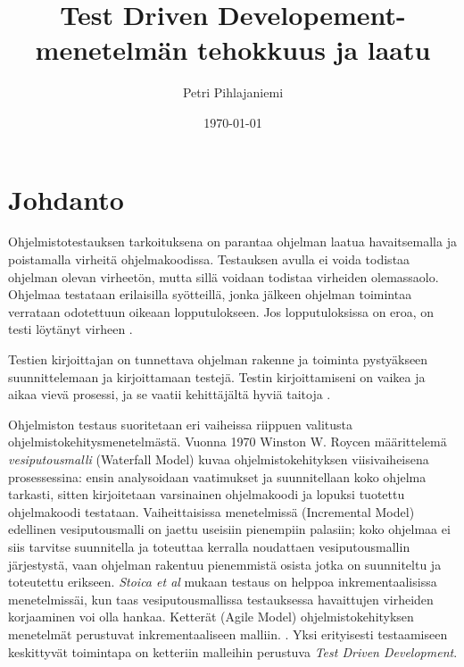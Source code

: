 \documentclass[finnish]{tktltiki2}
\title{Test Driven Developement-menetelmän tehokkuus ja laatu}
\author{Petri Pihlajaniemi}
\date{\today}
\theoremstyle{definition}
\theoremstyle{remark}
\begin{document}


\maketitle        %
\makeabstract     %

\tableofcontents  %


\mainmatter       %




\section{Johdanto}


Ohjelmistotestauksen tarkoituksena on parantaa ohjelman laatua havaitsemalla ja poistamalla virheitä ohjelmakoodissa. Testauksen avulla ei voida todistaa ohjelman olevan virheetön, mutta sillä voidaan todistaa virheiden olemassaolo. Ohjelmaa testataan erilaisilla syötteillä, jonka jälkeen ohjelman toimintaa verrataan odotettuun oikeaan lopputulokseen. Jos lopputuloksissa on eroa, on testi löytänyt virheen \cite{Muccini08}.


Testien kirjoittajan on tunnettava ohjelman rakenne ja toiminta pystyäkseen suunnittelemaan ja kirjoittamaan testejä. Testin kirjoittamiseni on vaikea ja aikaa vievä prosessi, ja se vaatii kehittäjältä hyviä taitoja \cite{Whittaker00}.

Ohjelmiston testaus suoritetaan eri vaiheissa riippuen valitusta ohjelmistokehitysmenetelmästä. Vuonna 1970 Winston W. Roycen määrittelemä \emph{vesiputousmalli} (Waterfall Model) kuvaa ohjelmistokehityksen viisivaiheisena prosessessina: ensin analysoidaan vaatimukset ja suunnitellaan koko ohjelma tarkasti, sitten kirjoitetaan varsinainen ohjelmakoodi ja lopuksi tuotettu ohjelmakoodi testataan. Vaiheittaisissa menetelmissä (Incremental Model) edellinen vesiputousmalli on jaettu useisiin pienempiin palasiin; koko ohjelmaa ei siis tarvitse suunnitella ja toteuttaa kerralla noudattaen vesiputousmallin järjestystä, vaan ohjelman rakentuu pienemmistä osista jotka on suunniteltu ja toteutettu erikseen. \emph{Stoica et al} mukaan testaus on helppoa inkrementaalisissa menetelmissäi, kun taas vesiputousmallissa testauksessa havaittujen virheiden korjaaminen voi olla hankaa. Ketterät (Agile Model) ohjelmistokehityksen menetelmät perustuvat inkrementaaliseen malliin. \cite{Stoica13}. Yksi erityisesti testaamiseen keskittyvät toimintapa on ketteriin malleihin perustuva \emph{Test Driven Development}. \cite{Crispin06}
\end{document}
